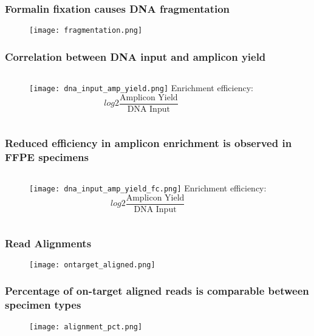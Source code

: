 \documentclass{beamer}
\begin{document}
\begin{frame}
\frametitle{Formalin fixation causes DNA fragmentation}
\begin{figure}[t]
    \texttt{[image: fragmentation.png]}
\end{figure}
\end{frame}

\begin{frame}
\frametitle{Correlation between DNA input and amplicon yield}
\begin{figure}[t]
    \begin{columns}
    \column{7cm}
    \centering
    \texttt{[image: dna\_input\_amp\_yield.png]}%
    \column{5cm}
    \centering
    Enrichment efficiency:
    \[
    log2\frac{\text{Amplicon Yield}}{\text{DNA Input}}
    \]
    \end{columns}
\end{figure}
\end{frame}

\begin{frame}
\frametitle{Reduced efficiency in amplicon enrichment is observed in FFPE specimens}
\begin{figure}[t]
    \begin{columns}
    \column{7cm}
    \centering
    \texttt{[image: dna\_input\_amp\_yield\_fc.png]}%
    \column{5cm}
    \centering
    Enrichment efficiency:
    \[
    log2\frac{\text{Amplicon Yield}}{\text{DNA Input}}
    \]
    \end{columns}
\end{figure}
\end{frame}

\begin{frame}
\frametitle{Read Alignments}
\begin{figure}[t]
    \texttt{[image: ontarget\_aligned.png]}
\end{figure}
\end{frame}

\begin{frame}
\frametitle{Percentage of on-target aligned reads is comparable between specimen types}
\begin{figure}[t]
    \texttt{[image: alignment\_pct.png]}
\end{figure}
\end{frame}
\end{document}
